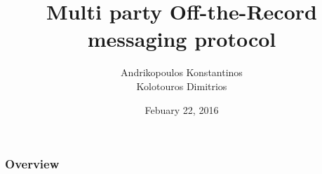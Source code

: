 \documentclass{beamer}
\title[mpOTR]{Multi party Off-the-Record messaging protocol} %
\author[Andrikopoulos, Kolotouros]{Andrikopoulos Konstantinos\\ Kolotouros Dimitrios} %
\institute[NTUA] %
{
National Technological University of Athens \texttt{[image: Figures/Pyrforos.png]} \\ %
\medskip
\textit{gkonstandinos@gmail.com\\ dim.kolotouros@gmail.com} %
}
\date{Febuary 22, 2016} %
\begin{document}
\begin{frame}
\titlepage %
\end{frame}

\begin{frame}
\frametitle{Overview} %
\tableofcontents %
\end{frame}



\end{document}
